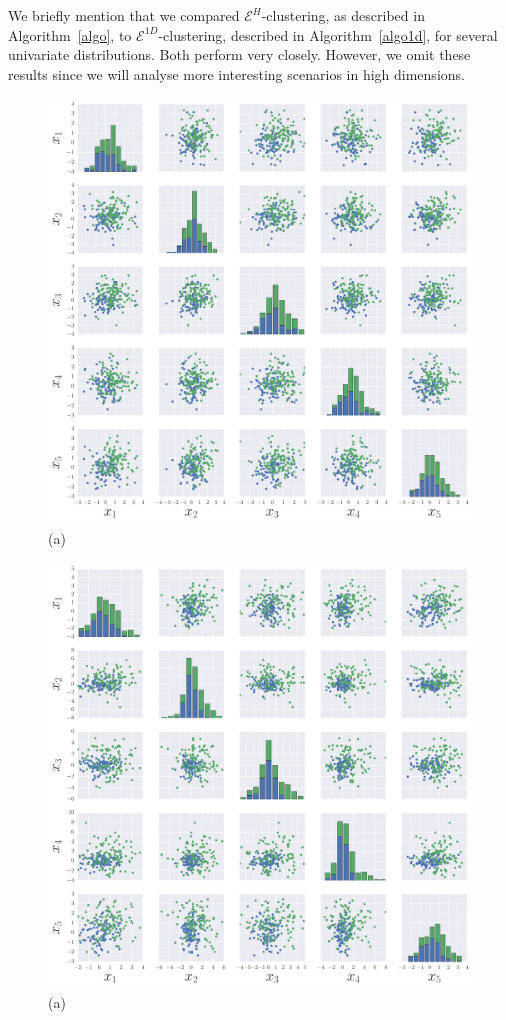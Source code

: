 \documentclass[aps,preprint,nofootinbib,floatfix]{revtex4-1}
\begin{document}
We briefly mention that we compared $\mathcal{E}^H$-clustering,
as described in Algorithm~\ref{algo}, to
$\mathcal{E}^{1D}$-clustering, described in Algorithm~\ref{algo1d}, 
for several univariate distributions.
Both perform very closely.
However, we omit these results since we will analyse more interesting 
scenarios in high dimensions.

\begin{figure}
\begin{minipage}{0.49\textwidth}
\includegraphics[width=1\textwidth]{pairsplot1.pdf}\\[-1.0em] (a)
\end{minipage}
\begin{minipage}{0.49\textwidth}
\includegraphics[width=1\textwidth]{pairsplot2.pdf}\\[-1.0em] (a)

\end{minipage}
\end{figure}
\end{document}
